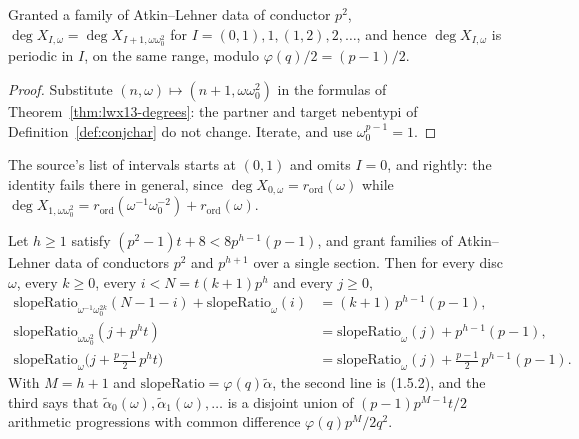 \begin{corollary}
  \label{cor:lwx14}
  \leanok
  Granted a family of Atkin--Lehner data of conductor $p^{2}$,
  $\deg X_{I,\omega} = \deg X_{I+1,\omega\omega_0^{2}}$ for $I = (0,1), 1, (1,2), 2, \dots$, and
  hence $\deg X_{I,\omega}$ is periodic in $I$, on the same range, modulo
  $\varphi(q)/2 = (p-1)/2$.
\end{corollary}

\begin{proof}
  \leanok
  Substitute $(n,\omega) \mapsto (n+1,\omega\omega_0^{2})$ in the formulas of
  Theorem~\ref{thm:lwx13-degrees}: the partner and target nebentypi of
  Definition~\ref{def:conjchar} do not change.  Iterate, and use $\omega_0^{p-1} = 1$.
\end{proof}

The source's list of intervals starts at $(0,1)$ and omits $I = 0$, and rightly: the identity
fails there in general, since $\deg X_{0,\omega} = r_{\mathrm{ord}}(\omega)$ while
$\deg X_{1,\omega\omega_0^{2}} = r_{\mathrm{ord}}(\omega^{-1}\omega_0^{-2}) +
r_{\mathrm{ord}}(\omega)$.

\begin{theorem}
  \label{thm:lwx152}
  \leanok
  Let $h \geq 1$ satisfy $(p^{2}-1)t + 8 < 8p^{h-1}(p-1)$, and grant families of Atkin--Lehner
  data of conductors $p^{2}$ and $p^{h+1}$ over a single section.  Then for every disc $\omega$,
  every $k \geq 0$, every $i < N = t(k+1)p^{h}$ and every $j \geq 0$,
  \begin{align*}
    \mathrm{slopeRatio}_{\omega^{-1}\omega_0^{2k}}(N-1-i) + \mathrm{slopeRatio}_{\omega}(i)
      &= (k+1)\,p^{h-1}(p-1), \\
    \mathrm{slopeRatio}_{\omega\omega_0^{2}}(j + p^{h}t)
      &= \mathrm{slopeRatio}_{\omega}(j) + p^{h-1}(p-1), \\
    \mathrm{slopeRatio}_{\omega}\bigl(j + \tfrac{p-1}{2}\,p^{h}t\bigr)
      &= \mathrm{slopeRatio}_{\omega}(j) + \tfrac{p-1}{2}\,p^{h-1}(p-1).
  \end{align*}
  With $M = h+1$ and $\mathrm{slopeRatio} = \varphi(q)\tilde\alpha$, the second line is (1.5.2),
  and the third says that $\tilde\alpha_0(\omega), \tilde\alpha_1(\omega), \dots$ is a disjoint
  union of $(p-1)p^{M-1}t/2$ arithmetic progressions with common difference
  $\varphi(q)p^{M}/2q^{2}$.
\end{theorem}

